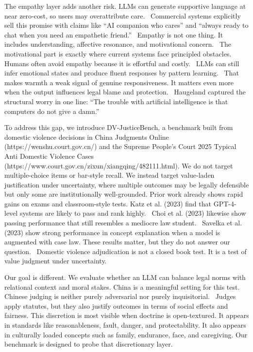 The empathy layer adds another risk. LLMs can generate supportive language at near zero-cost, so users may overattribute care.~\cite{ref17} Commercial systems explicitly sell this promise with claims like ``AI companion who cares'' and ``always ready to chat when you need an empathetic friend.''~\cite{ref18} Empathy is not one thing. It includes understanding, affective resonance, and motivational concern.~\cite{ref19} The motivational part is exactly where current systems face principled obstacles.~\cite{ref20} Humans often avoid empathy because it is effortful and costly.~\cite{ref21} LLMs can still infer emotional states and produce fluent responses by pattern learning.~\cite{ref22} That makes warmth a weak signal of genuine responsiveness. It matters even more when the output influences legal blame and protection.~\cite{ref23} Haugeland captured the structural worry in one line: ``The trouble with artificial intelligence is that computers do not give a damn.''~\cite{ref24}

To address this gap, we introduce DV-JusticeBench, a benchmark built from domestic violence decisions in China Judgments Online (https://wenshu.court.gov.cn/) and the Supreme People's Court 2025 Typical Anti Domestic Violence Cases (https://www.court.gov.cn/zixun/xiangqing/482111.html). We do not target multiple-choice items or bar-style recall. We instead target value-laden justification under uncertainty, where multiple outcomes may be legally defensible but only some are institutionally well-grounded. Prior work already shows rapid gains on exams and classroom-style tests. Katz et al. (2023) find that GPT-4-level systems are likely to pass and rank highly.~\cite{ref25} Choi et al. (2023) likewise show passing performance that still resembles a mediocre law student.~\cite{ref26} Savelka et al. (2023) show strong performance in concept explanation when a model is augmented with case law. These results matter, but they do not answer our question.~\cite{ref27} Domestic violence adjudication is not a closed book test. It is a test of value judgment under uncertainty.

Our goal is different. We evaluate whether an LLM can balance legal norms with relational context and moral stakes. China is a meaningful setting for this test. Chinese judging is neither purely adversarial nor purely inquisitorial.~\cite{ref28} Judges apply statutes, but they also justify outcomes in terms of social effects and fairness. This discretion is most visible when doctrine is open-textured. It appears in standards like reasonableness, fault, danger, and protectability. It also appears in culturally loaded concepts such as family, endurance, face, and caregiving. Our benchmark is designed to probe that discretionary layer.

